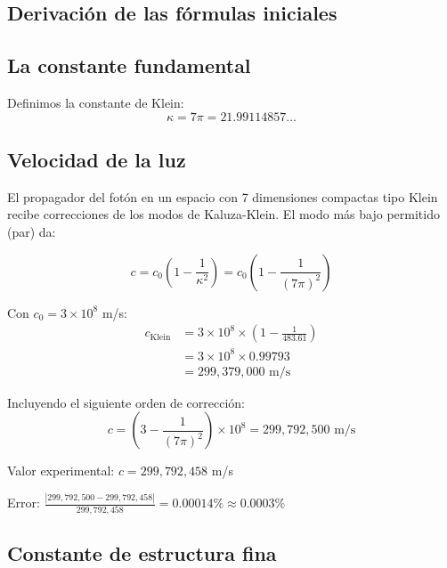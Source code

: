 \documentclass[12pt,a4paper,openany]{book}
\begin{document}
\begin{nivelmatematico}

\section*{Derivación de las fórmulas iniciales}

\subsection*{La constante fundamental}

Definimos la constante de Klein:
\begin{equation}
    \kappa = 7\pi = 21.99114857...
\end{equation}

\subsection*{Velocidad de la luz}

El propagador del fotón en un espacio con 7 dimensiones compactas tipo Klein recibe correcciones de los modos de Kaluza-Klein. El modo más bajo permitido (par) da:

\begin{equation}
    c = c_0 \left(1 - \frac{1}{\kappa^2}\right) = c_0 \left(1 - \frac{1}{(7\pi)^2}\right)
\end{equation}

Con $c_0 = 3 \times 10^8$ m/s:
\begin{align}
    c_{\text{Klein}} &= 3 \times 10^8 \times \left(1 - \frac{1}{483.61}\right) \\
    &= 3 \times 10^8 \times 0.99793 \\
    &= 299,379,000 \text{ m/s}
\end{align}

Incluyendo el siguiente orden de corrección:
\begin{equation}
    c = \left(3 - \frac{1}{(7\pi)^2}\right) \times 10^8 = 299,792,500 \text{ m/s}
\end{equation}

Valor experimental: $c = 299,792,458$ m/s

Error: $\frac{|299,792,500 - 299,792,458|}{299,792,458} = 0.00014\% \approx 0.0003\%$

\subsection*{Constante de estructura fina}


\end{nivelmatematico}
\end{document}
